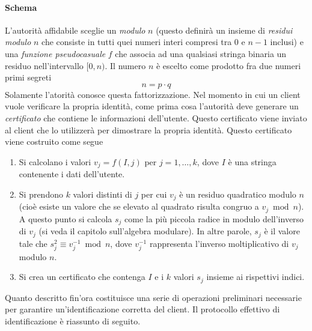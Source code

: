 \documentclass{article}
\theoremstyle{definition}
\begin{document}
\paragraph{Schema}
L'autorità affidabile sceglie un \emph{modulo} $n$ (questo definirà un insieme di \emph{residui modulo} $n$ che consiste in tutti quei numeri interi compresi tra 0 e $n-1$ inclusi) e una \emph{funzione pseudocasuale} $f$ che associa ad una qualsiasi stringa binaria un residuo nell'intervallo $[0, n)$. Il numero $n$ è escelto come prodotto fra due numeri primi segreti
\begin{equation*}
    n = p \cdot q
\end{equation*}
Solamente l'atorità conosce questa fattorizzazione.
Nel momento in cui un client vuole verificare la propria identità, come prima cosa l'autorità deve generare un \emph{certificato} che contiene le informazioni dell'utente. Questo certificato viene inviato al client che lo utilizzerà per dimostrare la propria identità. Questo certificato viene costruito come segue
\begin{enumerate}
    \item Si calcolano i valori $v_j = f(I, j)$ per $j = 1, \dots, k$, dove $I$ è una stringa contenente i dati dell'utente.
    \item Si prendono $k$ valori distinti di $j$ per cui $v_j$ è un residuo quadratico modulo $n$ (cioè esiste un valore che se elevato al quadrato risulta congruo a $v_j \bmod n$). A questo punto si calcola $s_j$ come la più piccola radice in modulo dell'inverso di $v_j$ (si veda il capitolo sull'algebra modulare). In altre parole, $s_j$ è il valore tale che $s_j^2 \equiv v_j^{-1} \bmod n$, dove $v_j^{-1}$ rappresenta l'inverso moltiplicativo di $v_j$ modulo $n$.
    \item Si crea un certificato che contenga $I$ e i $k$ valori $s_j$ insieme ai rispettivi indici.
\end{enumerate}

Quanto descritto fin'ora costituisce una serie di operazioni preliminari necessarie per garantire un'identificazione corretta del client.
Il protocollo effettivo di identificazione è riassunto di seguito.
\end{document}
